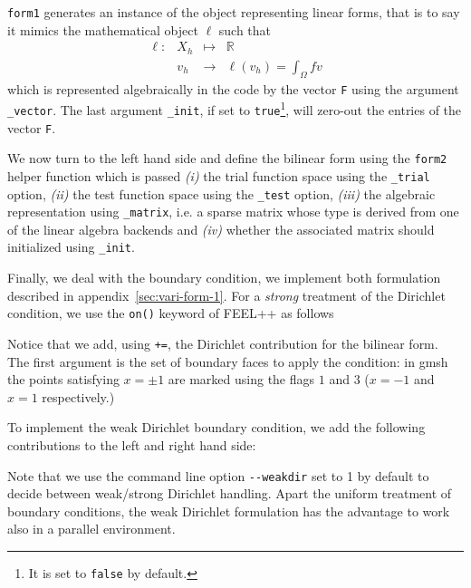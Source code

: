 \documentclass[11pt]{article}
\begin{document}
\noindent \lstinline!form1! generates an instance of the object
representing linear forms, that is to say it mimics the mathematical
object $\ell$ such that
\begin{equation}
  \label{eq:9}
  \begin{array}{rccl}
    \ell: & X_h & \mapsto & \mathbb{R}\\
    & v_h & \rightarrow &\ell(v_h)=\int_\Omega f v
  \end{array}
\end{equation}
which is represented algebraically in the code by the vector
\lstinline!F! using the argument \lstinline!_vector!. The last
argument \lstinline!_init!, if set to \lstinline!true!\footnote{It is
  set to \lstinline!false! by default.}, will zero-out the entries of
the vector \lstinline!F!.


We now turn to the left hand side and define the bilinear form using
the \lstinline!form2! helper function which is passed \textit{(i)} the
trial function space using the \lstinline!_trial! option,
\textit{(ii)} the test function space using the \lstinline!_test!
option, \textit{(iii)} the algebraic representation using
\lstinline!_matrix!, i.e. a sparse matrix whose type is derived from
one of the linear algebra backends and \textit{(iv)} whether the
associated matrix should initialized using
\lstinline!_init!.





Finally, we deal with the boundary condition, we implement both
formulation described in appendix~\ref{sec:vari-form-1}. For a
\emph{strong} treatment of the Dirichlet condition, we use the
\lstinline!on()! keyword of FEEL++ as follows



Notice that we add, using \lstinline!+=!, the Dirichlet contribution
for the bilinear form. The first argument is the set of boundary faces
to apply the condition: in gmsh the points satisfying $x=\pm 1$ are
marked using the flags $1$ and $3$ ($x=-1$ and $x=1$ respectively.)

To implement the weak Dirichlet boundary condition, we add the
following contributions to the left and right hand side:




Note that we use the command line option \lstinline!--weakdir! set to
1 by default to decide between weak/strong Dirichlet handling.  Apart
the uniform treatment of boundary conditions, the weak Dirichlet
formulation has the advantage to work also in a parallel environment.
\end{document}
